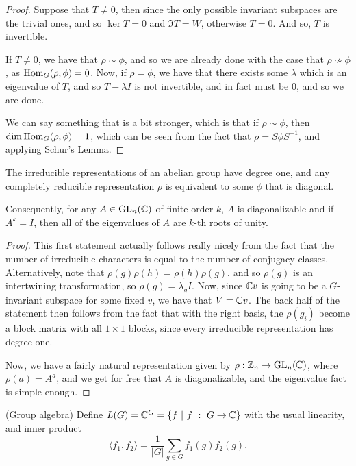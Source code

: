 \documentclass{article}
\begin{document}
\begin{proof}

Suppose that $T \neq 0$, then since the only possible invariant subspaces are the trivial ones, and so $\ker T = 0$ and $\Im T = W$, otherwise $T = 0$. And so, $T$ is invertible.

If $T \neq 0$, we have that $\rho \sim \phi$, and so we are already done with the case that $\rho \not\sim \phi$, as $\operatorname{Hom}_G(\rho,\phi) = 0$. Now, if $\rho = \phi$, we have that there exists some $\lambda$ which is an eigenvalue of $T$, and so $T-\lambda I $ is not invertible, and in fact must be $0$, and so we are done. 

We can say something that is a bit stronger, which is that if $\rho \sim \phi$, then $\dim \operatorname{Hom}_G(\rho, \phi) = 1$, which can be seen from the fact that $\rho = S \phi S^{-1}$, and applying Schur's Lemma.
\end{proof}

\begin{corollary}
The irreducible representations of an abelian group have degree one, and any completely reducible representation $\rho$ is equivalent to some $\phi$ that is diagonal.

Consequently, for any $A \in \operatorname{GL}_n(\mathbb C)$ of finite order $k$, $A$ is diagonalizable and if $A^k = I$, then all of the eigenvalues of $A$ are $k$-th roots of unity.
\end{corollary}
\begin{proof}
This first statement actually follows really nicely from the fact that the number of irreducible characters is equal to the number of conjugacy classes. Alternatively, note that $\rho(g)\rho(h) = \rho(h)\rho(g)$, and so $\rho(g)$ is an intertwining transformation, so $\rho(g) = \lambda_g I$. Now, since $\mathbb C v$ is going to be a $G$-invariant subspace for some fixed $v$, we have that $V = \mathbb C v$. The back half of the statement then follows from the fact that with the right basis, the $\rho(g_i)$ become a block matrix with all $1 \times 1$ blocks, since every irreducible representation has degree one.

Now, we have a fairly natural representation given by $\rho : \mathbb Z_n \to \operatorname{GL}_n(\mathbb C)$, where $\rho(a) = A^a$, and we get for free that $A$ is diagonalizable, and the eigenvalue fact is simple enough.
\end{proof}

\begin{definition}
(Group algebra) Define $L(G) = \mathbb C^G = \{ f \ | \ f \ : \ G \to \mathbb C \}$ with the usual linearity, and inner product $$\langle f_1, f_2 \rangle = \frac{1}{|G|} \sum_{g \in G} \overline{f_1(g)}f_2(g).$$
\end{definition}
\end{document}
